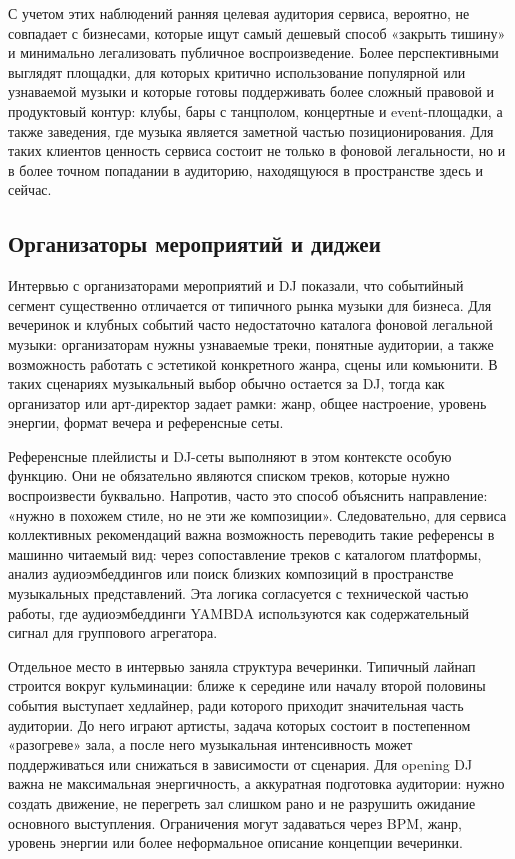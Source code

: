 С учетом этих наблюдений ранняя целевая аудитория сервиса, вероятно, не совпадает с бизнесами, которые ищут самый дешевый способ «закрыть тишину» и минимально легализовать публичное воспроизведение. Более перспективными выглядят площадки, для которых критично использование популярной или узнаваемой музыки и которые готовы поддерживать более сложный правовой и продуктовый контур: клубы, бары с танцполом, концертные и event-площадки, а также заведения, где музыка является заметной частью позиционирования. Для таких клиентов ценность сервиса состоит не только в фоновой легальности, но и в более точном попадании в аудиторию, находящуюся в пространстве здесь и сейчас.

\subsection{Организаторы мероприятий и диджеи}
\label{subsec:market:needs-events}

Интервью с организаторами мероприятий и DJ показали, что событийный сегмент существенно отличается от типичного рынка музыки для бизнеса. Для вечеринок и клубных событий часто недостаточно каталога фоновой легальной музыки: организаторам нужны узнаваемые треки, понятные аудитории, а также возможность работать с эстетикой конкретного жанра, сцены или комьюнити. В таких сценариях музыкальный выбор обычно остается за DJ, тогда как организатор или арт-директор задает рамки: жанр, общее настроение, уровень энергии, формат вечера и референсные сеты.

Референсные плейлисты и DJ-сеты выполняют в этом контексте особую функцию. Они не обязательно являются списком треков, которые нужно воспроизвести буквально. Напротив, часто это способ объяснить направление: «нужно в похожем стиле, но не эти же композиции». Следовательно, для сервиса коллективных рекомендаций важна возможность переводить такие референсы в машинно читаемый вид: через сопоставление треков с каталогом платформы, анализ аудиоэмбеддингов или поиск близких композиций в пространстве музыкальных представлений. Эта логика согласуется с технической частью работы, где аудиоэмбеддинги YAMBDA используются как содержательный сигнал для группового агрегатора.

Отдельное место в интервью заняла структура вечеринки. Типичный лайнап строится вокруг кульминации: ближе к середине или началу второй половины события выступает хедлайнер, ради которого приходит значительная часть аудитории. До него играют артисты, задача которых состоит в постепенном «разогреве» зала, а после него музыкальная интенсивность может поддерживаться или снижаться в зависимости от сценария. Для opening DJ важна не максимальная энергичность, а аккуратная подготовка аудитории: нужно создать движение, не перегреть зал слишком рано и не разрушить ожидание основного выступления. Ограничения могут задаваться через BPM, жанр, уровень энергии или более неформальное описание концепции вечеринки.

